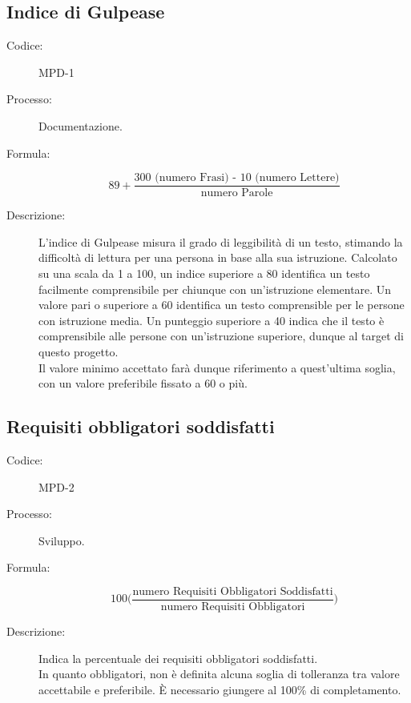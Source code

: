 \subsection{Indice di Gulpease}
\begin{description}
    \item[Codice:] MPD-1
    \item[Processo:] Documentazione.
    \item[Formula:] 
    \begin{equation}
    89 +
    \frac{\text{300 (numero Frasi) - 10 (numero Lettere)}}{\text{numero Parole}}
    \label{MPD-1}
    \end{equation}
    \item[Descrizione:] L'indice di Gulpease misura il grado di leggibilità di un testo, stimando la difficoltà di lettura per una persona in base alla sua istruzione. Calcolato su una scala da 1 a 100, un indice superiore a 80 identifica un testo facilmente comprensibile per chiunque con un'istruzione elementare. Un valore pari o superiore a 60 identifica un testo comprensible per le persone con istruzione media. Un punteggio superiore a 40 indica che il testo è comprensibile alle persone con un'istruzione superiore, dunque al target di questo progetto.\\Il valore minimo accettato farà dunque riferimento a quest'ultima soglia, con un valore preferibile fissato a 60 o più.
\end{description}

\subsection{Requisiti obbligatori soddisfatti}
\begin{description}
    \item[Codice:] MPD-2
    \item[Processo:] Sviluppo.
    \item[Formula:]
    \begin{equation}
        100\biggl(\frac{\text{numero Requisiti Obbligatori Soddisfatti}}{\text{numero Requisiti Obbligatori}}\biggr)
    \end{equation}
    \item[Descrizione:] Indica la percentuale dei requisiti obbligatori soddisfatti.\\ In quanto obbligatori, non è definita alcuna soglia di tolleranza tra valore accettabile e preferibile. È necessario giungere al 100\% di completamento.
\end{description}

